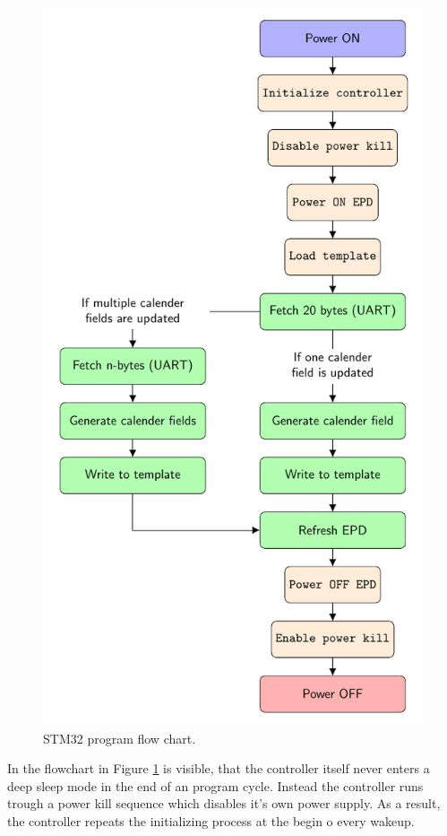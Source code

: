 \begin{figure}[ht]
	\centering
	\includegraphics[height=0.8\textheight]{4-development/software/graphics/main.pdf}
	\caption{STM32 program flow chart.\label{software:main}}
\end{figure}
In the flowchart in Figure \ref{software:main} is visible, that the controller itself never enters a deep sleep mode in the end of an program cycle. Instead the controller runs trough a power kill sequence which disables it's own power supply. As a result, the controller repeats the initializing process at the begin o every wakeup.

